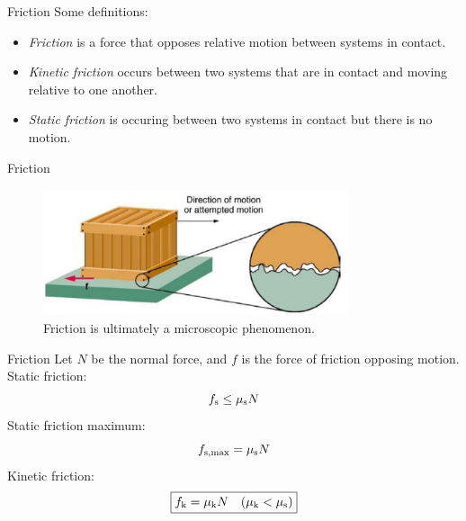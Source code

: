 \documentclass{beamer}
\begin{document}
\begin{frame}{Friction}
Some definitions: \\
\begin{itemize}
\item \textit{\alert{Friction}} is a force that opposes relative motion between systems in contact.
\item \textit{\alert{Kinetic friction}} occurs between two systems that are in contact and moving relative to one another.
\item \textit{\alert{Static friction}} is occuring between two systems in contact but there is no motion.
\end{itemize}
\end{frame}

\begin{frame}{Friction}
\begin{figure}
\centering
\includegraphics[width=0.8\textwidth]{figures/friction.png}
\caption{\label{fig:fric} Friction is ultimately a microscopic phenomenon.}
\end{figure}
\end{frame}

\begin{frame}{Friction}
Let $N$ be the normal force, and $f$ is the force of friction opposing motion. \\
\vspace{0.5cm}
Static friction: \\
\begin{equation}
f_{\rm s} \leq \mu_{\rm s} N
\end{equation}
Static friction maximum: \\
\begin{equation}
f_{\rm s,max} = \mu_{\rm s} N
\end{equation}
Kinetic friction: \\
\begin{equation}
\boxed{
f_{\rm k} = \mu_{\rm k} N ~~~ (\mu_{\rm k} < \mu_{\rm s})}
\end{equation}
\end{frame}
\end{document}
